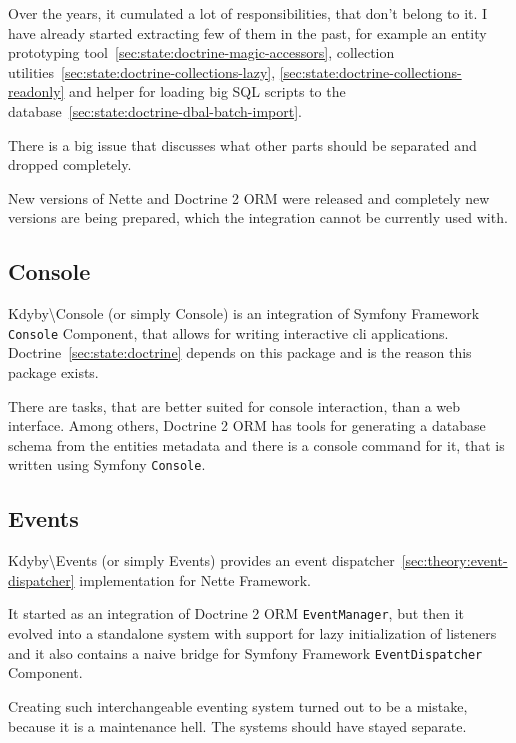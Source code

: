 Over the years, it cumulated a lot of responsibilities, that don't belong to it. I have already started extracting few of them in the past, for example an entity prototyping tool~\ref{sec:state:doctrine-magic-accessors}, collection utilities~\ref{sec:state:doctrine-collections-lazy}, \ref{sec:state:doctrine-collections-readonly} and helper for loading big SQL scripts to the database~\ref{sec:state:doctrine-dbal-batch-import}.

There is a big issue  that discusses what other parts should be separated and dropped completely.

New versions of Nette and Doctrine 2 ORM were released and completely new versions are being prepared, which the integration cannot be currently used with.

\subsection{Console} \label{sec:state:console}

Kdyby\textbackslash{}Console (or simply Console) is an integration of Symfony Framework \lstinline{Console} Component, that allows for writing interactive cli applications. Doctrine~\ref{sec:state:doctrine} depends on this package and is the reason this package exists.

There are tasks, that are better suited for console interaction, than a web interface. Among others, Doctrine 2 ORM has tools for generating a database schema from the entities metadata and there is a console command for it, that is written using Symfony \lstinline{Console}.

\subsection{Events} \label{sec:state:events}

Kdyby\textbackslash{}Events (or simply Events) provides an event dispatcher~\ref{sec:theory:event-dispatcher} implementation for Nette Framework.

It started as an integration of Doctrine 2 ORM \lstinline{EventManager}, but then it evolved into a standalone system with support for lazy initialization of listeners and it also contains a naive bridge for Symfony Framework \lstinline{EventDispatcher} Component.

Creating such interchangeable eventing system turned out to be a mistake, because it is a maintenance hell. The systems should have stayed separate.

